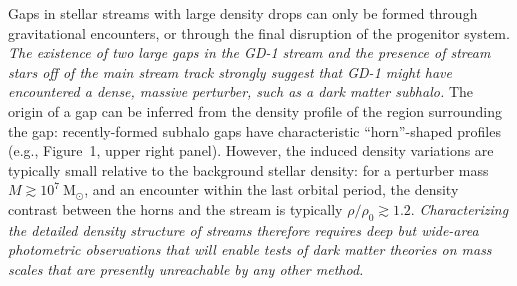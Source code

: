 \documentclass[11pt]{article}
\newcommand{\msun}{\textrm{M}_\odot}
\begin{document}
Gaps in stellar streams with large density drops can only be formed through gravitational encounters, or through the final disruption of the progenitor system.
\emph{The existence of two large gaps in the GD-1 stream and the presence of stream stars off of the main stream track strongly suggest that GD-1 might have encountered a dense, massive perturber, such as a dark matter subhalo.}
The origin of a gap can be inferred from the density profile of the region surrounding the gap: recently-formed subhalo gaps have characteristic ``horn''-shaped profiles (e.g., Figure~1, upper right panel).
However, the induced density variations are typically small relative to the background stellar density: for a perturber mass $M \gtrsim 10^7~\msun$, and an encounter within the last orbital period, the density contrast between the horns and the stream is typically $\rho/\rho_0 \gtrsim 1.2$.
\emph{Characterizing the detailed density structure of streams therefore requires deep but wide-area photometric observations that will enable tests of dark matter theories on mass scales that are presently unreachable by any other method.}
\end{document}
